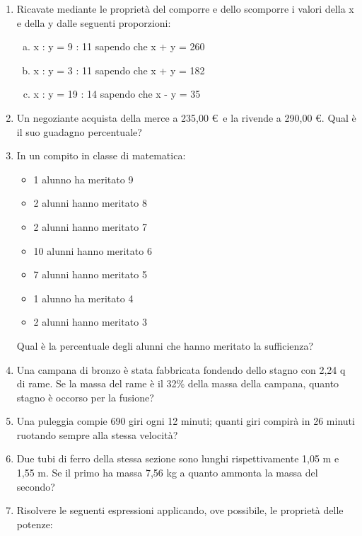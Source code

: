\documentclass[]{article}
\newcommand*\result[1] {\hspace*{0em plus 1fill}{\footnotesize \makebox{[#1]}}}
\begin{document}
\begin{enumerate}
		
		\item Ricavate mediante le proprietà del comporre e dello scomporre i valori della x e della y dalle seguenti proporzioni:
		
		\begin{enumerate}[a.]
			\item x : y = 9 : 11 \quad sapendo che \quad x + y = 260
			\item x : y = 3 : 11 \quad sapendo che \quad x + y = 182
			\item x : y = 19 : 14 \quad sapendo che \quad x - y = 35
		\end{enumerate}
		
		\item Un negoziante acquista della merce a 235,00 \euro \, e la rivende a 290,00 \euro. Qual è il suo guadagno percentuale? \result{23,4\%}
		
		\item In un compito in classe di matematica:
		\begin{itemize}
		 	\item 1 alunno ha meritato 9
		 	\item 2 alunni hanno meritato 8
		 	\item 2 alunni hanno meritato 7
		 	\item 10 alunni hanno meritato 6
		 	\item 7 alunni hanno meritato 5
		 	\item 1 alunno ha meritato 4
		 	\item 2 alunni hanno meritato 3
		\end{itemize}
		
		Qual è la percentuale degli alunni che hanno meritato la sufficienza? \result{60\%}
		
		\item Una campana di bronzo è stata fabbricata fondendo dello stagno con 2,24 q di rame. Se la massa del rame è il 32\% della massa della campana, quanto stagno è occorso per la fusione? \result{4,72 q}
		
		\item Una puleggia compie 690 giri ogni 12 minuti; quanti giri compirà in 26 minuti ruotando sempre alla stessa velocità? \result{1495}
		
		\item Due tubi di ferro della stessa sezione sono lunghi rispettivamente 1,05 m e 1,55 m. Se il primo ha massa 7,56 kg a quanto ammonta la massa del secondo? \result{11,16 kg}
		
		\item Risolvere le seguenti espressioni applicando, ove possibile, le proprietà delle potenze:
		

\end{enumerate}
\end{document}
